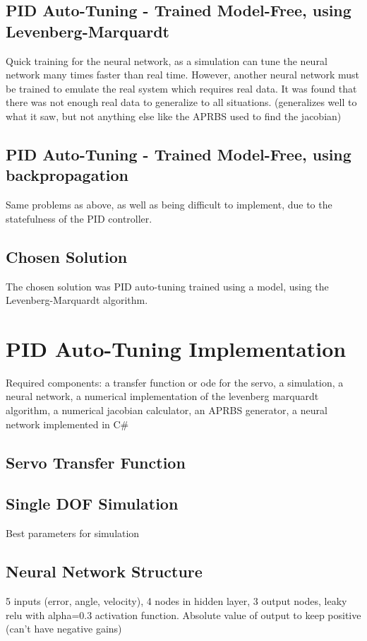 \documentclass[letterpaper,12pt]{article}
\begin{document}
\subsection{PID Auto-Tuning - Trained Model-Free, using Levenberg-Marquardt}
Quick training for the neural network, as a simulation can tune the neural network many times faster than real time. However, another neural network must be trained to emulate the real system which requires real data. It was found that there was not enough real data to generalize to all situations. (generalizes well to what it saw, but not anything else like the APRBS used to find the jacobian)
\subsection{PID Auto-Tuning - Trained Model-Free, using backpropagation}
Same problems as above, as well as being difficult to implement, due to the statefulness of the PID controller.

\subsection{Chosen Solution}
The chosen solution was PID auto-tuning trained using a model, using the Levenberg-Marquardt algorithm.

\section{PID Auto-Tuning Implementation}
Required components: a transfer function or ode for the servo, a simulation, a neural network, a numerical implementation of the levenberg marquardt algorithm, a numerical jacobian calculator, an APRBS generator, a neural network implemented in C\#
\subsection{Servo Transfer Function}

\subsection{Single DOF Simulation}
Best parameters for simulation

\subsection{Neural Network Structure}
5 inputs (error, angle, velocity), 4 nodes in hidden layer, 3 output nodes, leaky relu with alpha=0.3 activation function. Absolute value of output to keep positive (can't have negative gains)
\end{document}
